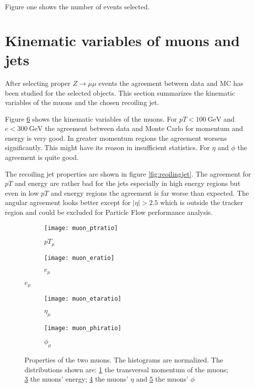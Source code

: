 Figure one shows the number of events selected. 

\section{Kinematic variables of muons and jets}

After selecting proper $Z \rightarrow \mu \mu$ events the agreement between data and MC has been studied for the selected objects. This section summarizes the kinematic variables of the muons and the chosen recoiling jet.

Figure \ref{fig:muons} shows the kinematic variables of the muons. For $pT<\SI{100}{\GeV}$ and $e<\SI{300}{\GeV}$ the agreement between data and Monte Carlo for momentum and energy is very good. In greater momentum regions the agreement worsens significantly. This might have its reason in insufficient statistics. For $\eta$ and $\phi$ the agreement is quite good.

The recoiling jet properties are shown in figure \ref{fig:reoilingjet}. The agreement for $pT$ and energy are rather bad for the jets especially in high energy regions but even in low $pT$ and energy regions the agreement is far worse than expected.
The angular agreement looks better except for $|\eta|>2.5$ which is outside the tracker region and could be excluded for Particle Flow performance analysis.



\begin{figure}[h]
\centering
\begin{subfigure}[b]{0.5\figwidth}
\texttt{[image: muon\_ptratio]}
\caption[Transversal momentum of the muons]{$pT_{\mu}$}
\label{fig:muonpt}
\end{subfigure}
\quad
\begin{subfigure}[b]{0.5\figwidth}
\texttt{[image: muon\_eratio]}
\caption[Energy of the muons]{$e_{\mu}$}
\label{fig:muone}
\end{subfigure}
\end{figure}


\begin{figure}[h]
\centering
\begin{subfigure}[b]{0.5\figwidth}
\texttt{[image: muon\_etaratio]}
\caption[$\eta$ of the muons]{$\eta_{\mu}$}
\label{fig:muoneta}
\end{subfigure}
\quad
\begin{subfigure}[b]{0.5\figwidth}
\texttt{[image: muon\_phiratio]}
\caption[$\phi$ of the muons]{$\phi_{\mu}$}
\label{fig:muonphi}
\end{subfigure}
\caption{Properties of the two muons. The histograms are normalized. The distributions shown are: \ref{fig:muonpt} the transversal momentum of the muons; \ref{fig:muone} the muons' energy; \ref{fig:muoneta} the muons' $\eta$ and \ref{fig:muonphi} the muons' $\phi$}
\label{fig:muons}
\end{figure}


